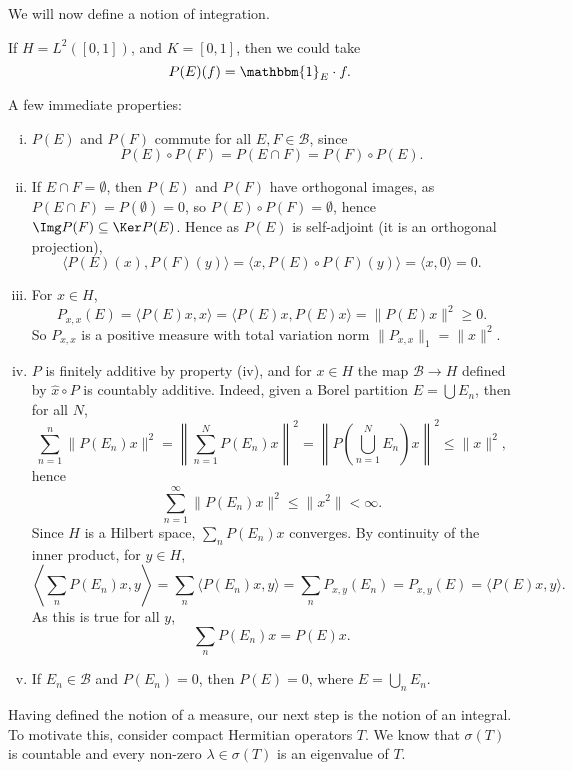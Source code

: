 \documentclass[12pt]{article}
\begin{document}
We will now define a notion of integration.

\begin{exbox}
	If $H = L^2([0, 1])$, and $K = [0, 1]$, then we could take
	\[
	P(E)(f) = \mathbbm{1}_{E} \cdot f.
	\]
\end{exbox}

A few immediate properties:
\begin{enumerate}[(i)]
	\item $P(E)$ and $P(F)$ commute for all $E, F \in \mathcal{B}$, since
		\[
		P(E) \circ P(F) = P(E \cap F) = P(F) \circ P(E).
		\]
	\item If $E \cap F = \emptyset$, then $P(E)$ and $P(F)$ have orthogonal images, as $P(E \cap F) = P(\emptyset) = 0$, so $P(E) \circ P(F) = \emptyset$, hence $\Img P(F) \subseteq \Ker P(E)$. Hence as $P(E)$ is self-adjoint (it is an orthogonal projection),
		\[
		\langle P(E)(x), P(F)(y) \rangle = \langle x, P(E) \circ P(F)(y) \rangle = \langle x, 0 \rangle = 0.
		\]
	\item For $x \in H$,
		\[
		P_{x, x}(E) = \langle P(E) x, x\rangle = \langle P(E) x, P(E) x\rangle = \|P(E) x\|^2 \geq 0.
		\]
		So $P_{x, x}$ is a positive measure with total variation norm $\|P_{x,x}\|_1 = \|x\|^2$.
	\item $P$ is finitely additive by property (iv), and for $x \in H$ the map $\mathcal{B} \to H$ defined by $\hat x \circ P$ is countably additive. Indeed, given a Borel partition $E = \bigcup E_n$, then for all $N$,
		\[
		\sum_{n=1}^n \|P(E_n)x\|^2 = \left\| \sum_{n =1}^N P(E_n) x \right\|^2 = \left\| P \left( \bigcup_{n = 1}^N E_n \right) x \right\|^2 \leq \|x\|^2,
		\]
		hence
		\[
		\sum_{n= 1}^\infty \|P(E_n)x\|^2  \leq \|x^2\| < \infty.
		\]
		Since $H$ is a Hilbert space, $\sum_n P(E_n) x$ converges. By continuity of the inner product, for $y \in H$,
		\[
		\left \langle \sum_n P(E_n) x , y \right \rangle = \sum_n \langle P(E_n) x, y \rangle = \sum_n P_{x, y}(E_n) = P_{x, y}(E)=  \langle P(E) x, y \rangle.
		\]
		As this is true for all $y$,
		\[
		\sum_n P(E_n) x = P(E) x.
		\]
	\item If $E_n \in \mathcal{B}$ and $P(E_n) = 0$, then $P(E) = 0$, where $E = \bigcup_n E_n$.
\end{enumerate}

Having defined the notion of a measure, our next step is the notion of an integral. To motivate this, consider compact Hermitian operators $T$. We know that $\sigma(T)$ is countable and every non-zero $\lambda \in \sigma(T)$ is an eigenvalue of $T$.
\end{document}

